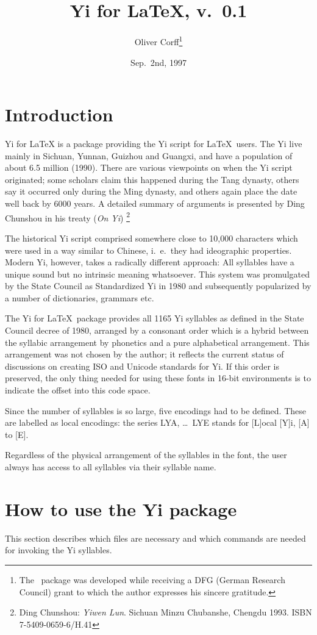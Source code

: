 \documentclass[11pt,a4paper]{article}
\title{\huge\textbf{\Ynuo\Ysu\Ybbur\Yma}\\
	\vspace{.25cm}
	\sf Yi for \LaTeX , v.~0.1}
\author{Oliver Corff\protect\footnote{%
	The \YiL\ package was developed while receiving 
	a DFG (German Research Council) grant to which
	the author expresses his sincere gratitude.}}
\date{Sep.~2nd, 1997}
\newcommand{\YiL}{\textsf{Yi for \LaTeX}}
\begin{document}
\maketitle
\thispagestyle{myheadings}

\section{Introduction}
{\YiL} is a package providing the Yi script for \LaTeX\ users.
The Yi live mainly in Sichuan, Yunnan, Guizhou and Guangxi, and
have a population of about 6.5 million (1990). There are various
viewpoints on when the Yi script originated; some scholars claim
this happened during the Tang dynasty, others say it occurred
only during the Ming dynasty, and others again place the date
well back by 6000 years. A detailed summary of arguments is
presented by Ding Chunshou in his treaty (\emph{On Yi})%
\footnote{Ding Chunshou: \emph{Yiwen Lun}. Sichuan Minzu Chubanshe,
Chengdu 1993. ISBN 7-5409-0659-6/H.41}

The historical Yi script comprised somewhere close to 10,000
characters which were used in a way similar to Chinese, i.~e.~they
had ideographic properties. Modern Yi, however, takes a radically
different approach: All syllables have a unique sound but no
intrinsic meaning whatsoever. This system was promulgated by the
State Council as Standardized Yi in 1980 and subsequently popularized
by a number of dictionaries, grammars etc.

The \YiL\ package provides all 1165 Yi syllables as defined in the State
Council decree of 1980, arranged by a consonant order which is a
hybrid between the syllabic arrangement by phonetics and a pure
alphabetical arrangement. This arrangement was not chosen by the
author; it reflects the current status of discussions on creating
ISO and Unicode standards for Yi. If this order is preserved,
the only thing needed for using these fonts in 16-bit environments 
is to indicate the offset into this code space.

Since the number of syllables is so large, five encodings had
to be defined.  These are labelled as local encodings: the
series LYA, \dots\ LYE stands for [L]ocal [Y]i, [A] to [E].

Regardless of the physical arrangement of the syllables in the font,
the user always has access to all syllables via their syllable name.


\section{How to use the Yi package}
This section describes which files are necessary and which commands
are needed for invoking the Yi syllables.
\end{document}
